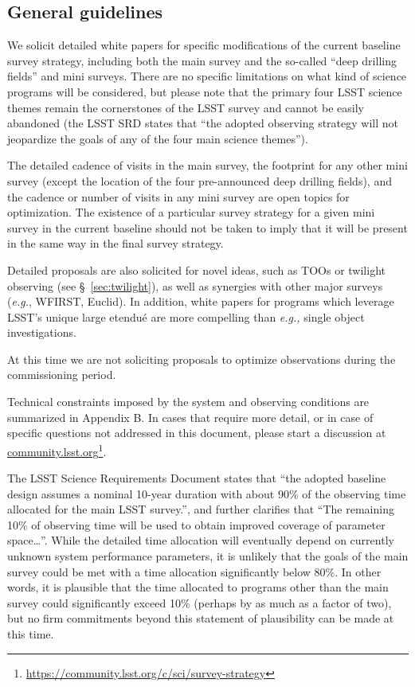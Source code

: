 \documentclass[DM,lsstdraft,toc,usenatbib]{lsstdoc}
\begin{document}
\subsection{General guidelines} 

We solicit detailed white papers for specific modifications of the current baseline survey strategy, including 
both the main survey and the so-called ``deep drilling fields'' and mini surveys. There are no 
specific limitations on what kind of science programs will be considered, but please note that 
the primary four LSST science themes remain the cornerstones of the LSST survey and cannot 
be easily abandoned (the LSST SRD states that ``the adopted observing 
strategy will not jeopardize the goals of any of the four main science themes'').  

The detailed cadence of visits in the main survey, the footprint for any other mini survey (except the location of the four pre-announced
deep drilling fields), and the cadence or number of visits in any mini survey are open topics for optimization. The existence of a 
particular survey strategy for a given mini survey in the current baseline should not be taken to imply that it will be present in the same way in the final 
survey strategy. 

Detailed proposals are also solicited for novel ideas, such as TOOs or twilight observing (see \S~\ref{sec:twilight}), 
as well as synergies with other major surveys ({\it e.g.}, WFIRST, Euclid). In addition, white papers for programs
which leverage LSST's unique large etendu\'e are more compelling than {\it e.g.,} single object investigations.  

At this time we are not soliciting proposals to optimize observations during the commissioning period.

Technical constraints imposed by the system and observing conditions are summarized in 
Appendix B. In cases that require more detail, or in case of specific questions not addressed in this 
document, please start a discussion at \href{http://community.lsst.org}{community.lsst.org}\footnote{\url{https://community.lsst.org/c/sci/survey-strategy}}.

The LSST Science Requirements Document states that ``the adopted baseline design assumes a 
nominal 10-year duration with about 90\% of the observing time allocated for the main LSST survey.'',
and further clarifies that ``The remaining 10\% of observing time will be used to obtain improved 
coverage of parameter space\dots''. While the detailed time allocation will eventually depend on currently unknown system
performance parameters, it is unlikely that the goals of the main survey could be met with a time allocation
significantly below 80\%. In other words, it is plausible that the time allocated to programs other
than the main survey could significantly exceed 10\% (perhaps by as much as a factor of two), but 
no firm commitments beyond this statement of plausibility can be made at this time. 
\end{document}
